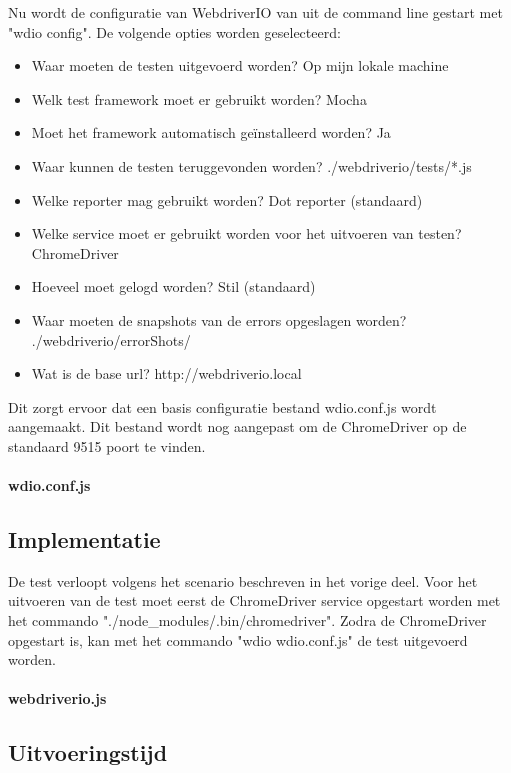Nu wordt de configuratie van WebdriverIO van uit de command line gestart met "wdio config". De volgende opties worden geselecteerd:
\begin{itemize}
\item Waar moeten de testen uitgevoerd worden? Op mijn lokale machine
\item Welk test \gls{framework} moet er gebruikt worden? Mocha
\item Moet het \gls{framework} automatisch geïnstalleerd worden? Ja
\item Waar kunnen de testen teruggevonden worden? ./webdriverio/tests/*.js
\item Welke reporter mag gebruikt worden? Dot reporter (standaard)
\item Welke service moet er gebruikt worden voor het uitvoeren van testen? ChromeDriver
\item Hoeveel moet gelogd worden? Stil (standaard)
\item Waar moeten de \glspl{snapshot} van de errors opgeslagen worden? ./webdriverio/errorShots/
\item Wat is de base url? http://webdriverio.local
\end{itemize}
Dit zorgt ervoor dat een basis configuratie bestand wdio.conf.js wordt aangemaakt. Dit bestand wordt nog aangepast om de ChromeDriver op de standaard 9515 poort te vinden.

\paragraph{wdio.conf.js}

\subsection{Implementatie}
De test verloopt volgens het scenario beschreven in het vorige deel. Voor het uitvoeren van de test moet eerst de ChromeDriver service opgestart worden met het commando "./node\_modules/.bin/chromedriver". Zodra de ChromeDriver opgestart is, kan met het commando "wdio wdio.conf.js" de test uitgevoerd worden.

\paragraph{webdriverio.js}


\subsection{Uitvoeringstijd}


